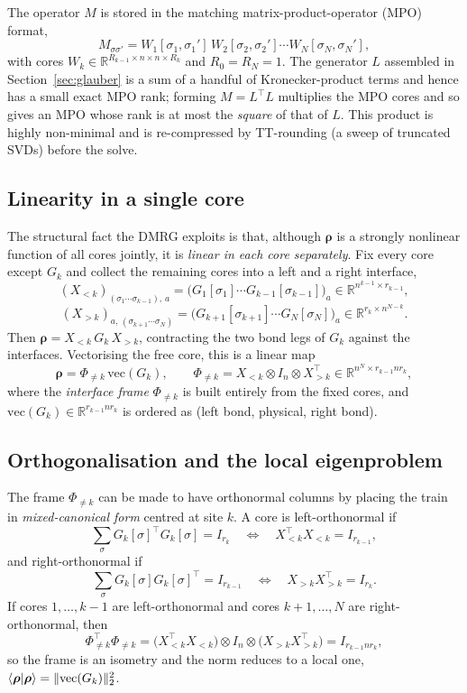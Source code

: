 \documentclass[12pt]{article}
\newcommand{\R}{\mathbb{R}}
\newcommand{\brho}{\boldsymbol{\rho}}
\theoremstyle{definition}
\theoremstyle{remark}
\begin{document}
The operator $M$ is stored in the matching matrix-product-operator (MPO) format,
\[
M_{\sigma\sigma'} = W_1[\sigma_1, \sigma_1']\, W_2[\sigma_2, \sigma_2'] \cdots W_N[\sigma_N, \sigma_N'],
\]
with cores $W_k \in \R^{R_{k-1} \times n \times n \times R_k}$ and $R_0 = R_N = 1$. The generator $L$ assembled in Section~\ref{sec:glauber} is a sum of a handful of Kronecker-product terms and hence has a small exact MPO rank; forming $M = L^\top L$ multiplies the MPO cores and so gives an MPO whose rank is at most the \emph{square} of that of $L$. This product is highly non-minimal and is re-compressed by TT-rounding (a sweep of truncated SVDs) before the solve.

\subsection{Linearity in a single core}\label{sec:core-linearity}

The structural fact the DMRG exploits is that, although $\brho$ is a strongly nonlinear function of all cores jointly, it is \emph{linear in each core separately}. Fix every core except $G_k$ and collect the remaining cores into a left and a right interface,
\[
(X_{<k})_{(\sigma_1 \cdots \sigma_{k-1}),\, a}
  = \big(G_1[\sigma_1] \cdots G_{k-1}[\sigma_{k-1}]\big)_a
  \in \R^{n^{k-1} \times r_{k-1}},
\]
\[
(X_{>k})_{a,\, (\sigma_{k+1} \cdots \sigma_N)}
  = \big(G_{k+1}[\sigma_{k+1}] \cdots G_N[\sigma_N]\big)_a
  \in \R^{r_k \times n^{N-k}}.
\]
Then $\brho = X_{<k}\, G_k\, X_{>k}$, contracting the two bond legs of $G_k$ against the interfaces. Vectorising the free core, this is a linear map
\[
\brho = \Phi_{\neq k}\, \mathrm{vec}(G_k),
\qquad
\Phi_{\neq k} = X_{<k} \otimes I_n \otimes X_{>k}^\top
\in \R^{n^N \times r_{k-1} n r_k},
\]
where the \emph{interface frame} $\Phi_{\neq k}$ is built entirely from the fixed cores, and $\mathrm{vec}(G_k) \in \R^{r_{k-1} n r_k}$ is ordered as (left bond, physical, right bond).

\subsection{Orthogonalisation and the local eigenproblem}\label{sec:local-eig}

The frame $\Phi_{\neq k}$ can be made to have orthonormal columns by placing the train in \emph{mixed-canonical form} centred at site $k$. A core is left-orthonormal if
\[
\sum_{\sigma} G_k[\sigma]^\top G_k[\sigma] = I_{r_k}
\quad \Longleftrightarrow \quad
X_{<k}^\top X_{<k} = I_{r_{k-1}},
\]
and right-orthonormal if
\[
\sum_{\sigma} G_k[\sigma] G_k[\sigma]^\top = I_{r_{k-1}}
\quad \Longleftrightarrow \quad
X_{>k} X_{>k}^\top = I_{r_k}.
\]
If cores $1, \dots, k-1$ are left-orthonormal and cores $k+1, \dots, N$ are right-orthonormal, then
\[
\Phi_{\neq k}^\top \Phi_{\neq k}
= \big(X_{<k}^\top X_{<k}\big) \otimes I_n \otimes \big(X_{>k} X_{>k}^\top\big)
= I_{r_{k-1} n r_k},
\]
so the frame is an isometry and the norm reduces to a local one, $\braket{\brho | \brho} = \|\mathrm{vec}(G_k)\|_2^2$.
\end{document}
